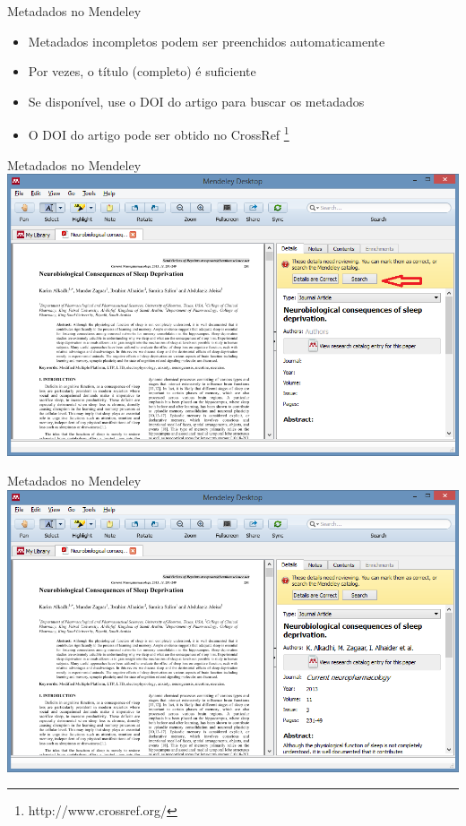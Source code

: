 \documentclass{beamer}
\begin{document}
\begin{frame}{Metadados no Mendeley}
  \begin{itemize}
  \item Metadados incompletos podem ser preenchidos automaticamente
  \item Por vezes, o título (completo) é suficiente
  \item Se disponível, use o DOI do artigo para buscar os metadados
  \item O DOI do artigo pode ser obtido no CrossRef
    \footnote{http://www.crossref.org/}
  \end{itemize}
\end{frame}

\begin{frame}{Metadados no Mendeley}
  \includegraphics[width=\textwidth]{Referencias/mendeley-busca1}
\end{frame}

\begin{frame}{Metadados no Mendeley}
  \includegraphics[width=\textwidth]{Referencias/mendeley-busca2}
\end{frame}
\end{document}
